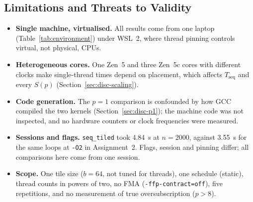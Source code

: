 \documentclass[conference,a4paper]{IEEEtran}
\newcommand{\code}[1]{\texttt{#1}}
\newcommand{\seqk}{\code{seq\_tiled}}
\newcommand{\Tseq}{T_{\mathrm{seq}}}
\begin{document}
\subsection{Limitations and Threats to Validity}
\label{sec:limits}
\begin{itemize}[itemsep=1pt]
  \item \textbf{Single machine, virtualised.} All results come from one
        laptop (Table~\ref{tab:environment}) under WSL~2, where thread pinning
        controls virtual, not physical, CPUs.
  \item \textbf{Heterogeneous cores.} One Zen~5 and three Zen~5c cores with
        different clocks make single-thread times depend on placement, which
        affects $\Tseq$ and every $S(p)$ (Section~\ref{sec:disc-scaling}).
  \item \textbf{Code generation.} The $p = 1$ comparison is confounded by
        how GCC compiled the two kernels (Section~\ref{sec:disc-p1}); the
        machine code was not inspected, and no hardware counters or clock
        frequencies were measured.
  \item \textbf{Sessions and flags.} \seqk{} took 4.84~s at $n = 2000$, against
        3.55~s for the same loops at \code{-O2} in Assignment~2. Flags,
        session and pinning differ; all comparisons here come from one session.
  \item \textbf{Scope.} One tile size ($b = 64$, not tuned for threads), one
        schedule (static), thread counts in powers of two, no FMA
        (\code{-ffp-contract=off}), five repetitions, and no measurement of
        true oversubscription ($p > 8$).
\end{itemize}

\end{document}
